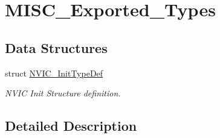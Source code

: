\hypertarget{group___m_i_s_c___exported___types}{}\section{M\+I\+S\+C\+\_\+\+Exported\+\_\+\+Types}
\label{group___m_i_s_c___exported___types}
\subsection*{Data Structures}
\begin{DoxyCompactItemize}
\item 
struct \mbox{\hyperlink{struct_n_v_i_c___init_type_def}{N\+V\+I\+C\+\_\+\+Init\+Type\+Def}}
\begin{DoxyCompactList}\small\item\em N\+V\+IC Init Structure definition. \end{DoxyCompactList}\end{DoxyCompactItemize}


\subsection{Detailed Description}
